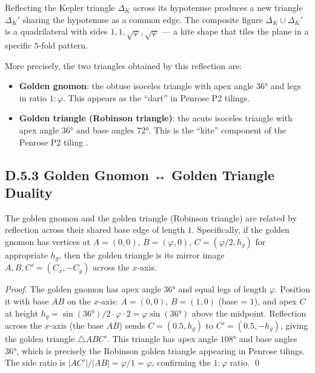 Reflecting the Kepler triangle $\Delta_K$ across its hypotenuse produces a new
triangle $\Delta_K'$ sharing the hypotenuse as a common edge.  The composite
figure $\Delta_K \cup \Delta_K'$ is a quadrilateral with sides
$1, 1, \sqrt{\varphi}, \sqrt{\varphi}$ — a kite shape that tiles the plane in a
specific $5$-fold pattern.

More precisely, the two triangles obtained by this reflection are:
\begin{itemize}
  \item \textbf{Golden gnomon}: the obtuse isoceles triangle with apex angle
    $36°$ and legs in ratio $1:\varphi$.  This appears as the ``dart'' in
    Penrose P2 tilings.
  \item \textbf{Golden triangle (Robinson triangle)}: the acute isoceles triangle
    with apex angle $36°$ and base angles $72°$.  This is the ``kite'' component
    of the Penrose P2 tiling \cite{penrose1974}.
\end{itemize}

\subsection*{D.5.3  Golden Gnomon ↔ Golden Triangle Duality}

\begin{lemma}
\label{lem:D:3}
The golden gnomon and the golden triangle (Robinson triangle) are related by
reflection across their shared base edge of length $1$.  Specifically, if the
golden gnomon has vertices at $A=(0,0)$, $B=(\varphi,0)$,
$C=(\varphi/2, h_g)$ for appropriate $h_g$, then the golden triangle is its
mirror image $A, B, C'=(C_x, -C_y)$ across the $x$-axis.
\end{lemma}

\begin{proof}
The golden gnomon has apex angle $36°$ and equal legs of length $\varphi$.
Position it with base $AB$ on the $x$-axis: $A=(0,0)$, $B=(1,0)$ (base = $1$),
and apex $C$ at height $h_g = \sin(36°)/2 \cdot \varphi \cdot 2
= \varphi\sin(36°)$ above the midpoint.
Reflection across the $x$-axis (the base $AB$) sends $C=(0.5, h_g)$
to $C'=(0.5,-h_g)$, giving the golden triangle $\triangle ABC'$.
This triangle has apex angle $108°$ and base angles $36°$, which is precisely
the Robinson golden triangle appearing in Penrose tilings.
The side ratio is $|AC'|/|AB| = \varphi/1 = \varphi$, confirming the $1:\varphi$
ratio. \qed
\end{proof}

